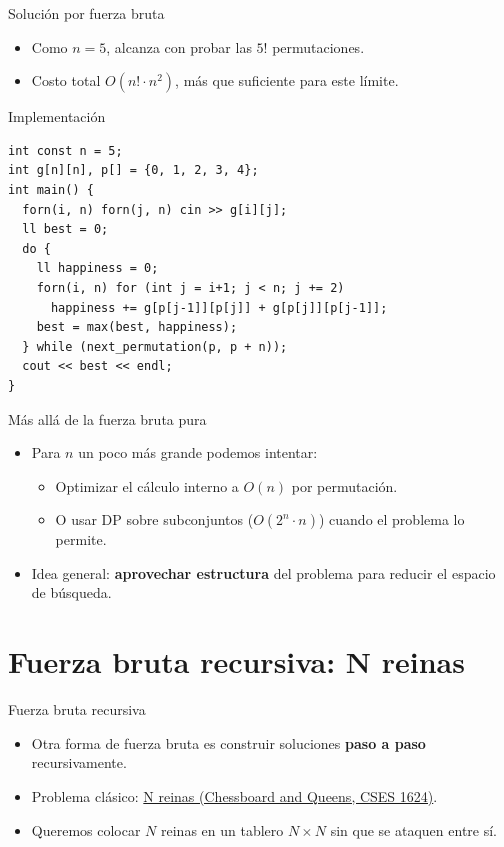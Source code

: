 \documentclass[aspectratio=169]{beamer}
\begin{document}
\begin{frame}[fragile]{Solución por fuerza bruta}
  \begin{itemize}
    \item Como \(n = 5\), alcanza con probar las \(5!\) permutaciones.
    \item Costo total \(O(n! \cdot n^2)\), más que suficiente para este límite.
  \end{itemize}
  \begin{block}{Implementación}
  \begin{lstlisting}[style=customc]
int const n = 5;
int g[n][n], p[] = {0, 1, 2, 3, 4};
int main() {
  forn(i, n) forn(j, n) cin >> g[i][j];
  ll best = 0;
  do {
    ll happiness = 0;
    forn(i, n) for (int j = i+1; j < n; j += 2)
      happiness += g[p[j-1]][p[j]] + g[p[j]][p[j-1]];
    best = max(best, happiness);
  } while (next_permutation(p, p + n));
  cout << best << endl;
}\end{lstlisting}
  \end{block}
\end{frame}

\begin{frame}{Más allá de la fuerza bruta pura}
  \begin{itemize}
    \item Para \(n\) un poco más grande podemos intentar:
      \begin{itemize}
        \item Optimizar el cálculo interno a \(O(n)\) por permutación.
        \item O usar DP sobre subconjuntos (\(O(2^n \cdot n)\)) cuando el problema lo permite.
      \end{itemize}
    \item Idea general: \textbf{aprovechar estructura} del problema para reducir el espacio de búsqueda.
  \end{itemize}
\end{frame}

\section{Fuerza bruta recursiva: N reinas}

\begin{frame}{Fuerza bruta recursiva}
  \begin{itemize}
    \item Otra forma de fuerza bruta es construir soluciones \textbf{paso a paso} recursivamente.
    \item Problema clásico: \href{https://cses.fi/problemset/task/1624}{N reinas (Chessboard and Queens, CSES 1624)}.
    \item Queremos colocar \(N\) reinas en un tablero \(N \times N\) sin que se ataquen entre sí.
  \end{itemize}
\end{frame}
\end{document}
